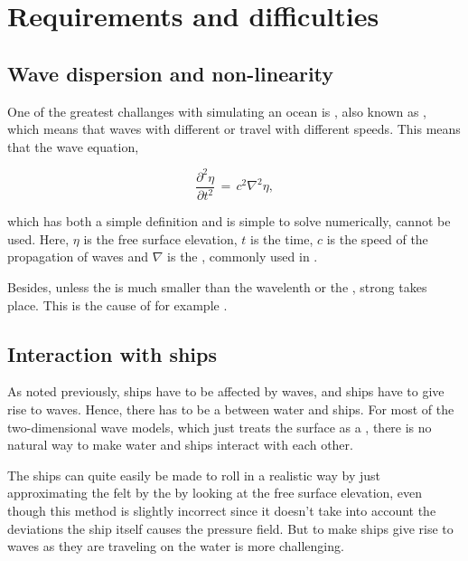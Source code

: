 \chapter{Requirements and difficulties}

\section{Wave dispersion and non-linearity}

One of the greatest challanges with simulating an ocean is , also known as , which means that waves with different \wavelengths or \frequencies travel with different speeds. This means that the wave equation,

\begin{equation} \label{eq:wave_equation}
\frac{\partial^2 \eta}{\partial t^2} \,=\, c^2\nabla^2\eta,
\end{equation}

which has both a simple definition and is simple to solve numerically, cannot be used. Here, $\eta$ is the free surface elevation, $t$ is the time, $c$ is the speed of the propagation of waves and $\nabla$ is the , commonly used in .

Besides, unless the  is much smaller than the wavelenth or the , strong  takes place. This is the cause of for example .

\section{Interaction with ships}

As noted previously, ships have to be affected by waves, and ships have to give rise to waves. Hence, there has to be a  between water and ships. For most of the two-dimensional wave models, which just treats the surface as a , there is no natural way to make water and ships interact with each other.

The ships can quite easily be made to roll in a realistic way by just approximating the  felt by the  by looking at the free surface elevation, even though this method is slightly incorrect since it doesn't take into account the deviations the ship itself causes the pressure field. But to make ships give rise to waves as they are traveling on the water is more challenging.

